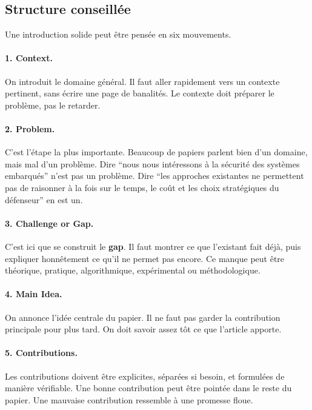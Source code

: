 \documentclass[11pt,a4paper]{article}
\theoremstyle{definition}
\begin{document}
\subsection*{Structure conseillée}

Une introduction solide peut être pensée en six mouvements.

\paragraph{1. Context.}
On introduit le domaine général. Il faut aller rapidement vers un contexte pertinent, sans écrire une page de banalités. Le contexte doit préparer le problème, pas le retarder.

\paragraph{2. Problem.}
C'est l'étape la plus importante. Beaucoup de papiers parlent bien d'un domaine, mais mal d'un problème. Dire ``nous nous intéressons à la sécurité des systèmes embarqués'' n'est pas un problème. Dire ``les approches existantes ne permettent pas de raisonner à la fois sur le temps, le coût et les choix stratégiques du défenseur'' en est un.


\paragraph{3. Challenge or Gap.}
C'est ici que se construit le \textbf{gap}. Il faut montrer ce que l'existant fait déjà, puis expliquer honnêtement ce qu'il ne permet pas encore. Ce manque peut être théorique, pratique, algorithmique, expérimental ou méthodologique.

\paragraph{4. Main Idea.}
On annonce l'idée centrale du papier. Il ne faut pas garder la contribution principale pour plus tard. On doit savoir assez tôt ce que l'article apporte.

\paragraph{5. Contributions.}
Les contributions doivent être explicites, séparées si besoin, et formulées de manière vérifiable. Une bonne contribution peut être pointée dans le reste du papier. Une mauvaise contribution ressemble à une promesse floue.
\end{document}
